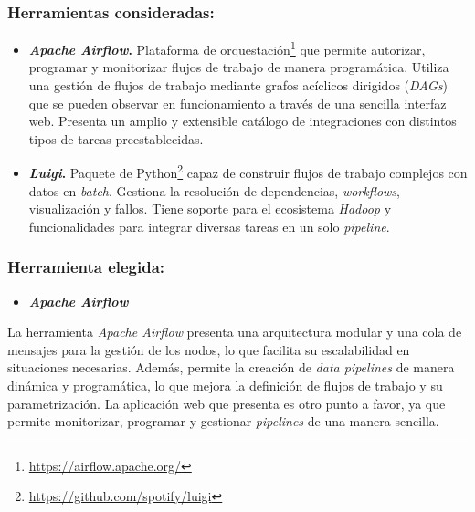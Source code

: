 \subsubsection{Herramientas consideradas:}

\begin{itemize}
    \item \textbf{\textit{Apache Airflow}.} Plataforma de orquestación\footnote{\url{https://airflow.apache.org/}} que permite autorizar, programar y monitorizar flujos de trabajo de manera programática. Utiliza una gestión de flujos de trabajo mediante grafos acíclicos dirigidos (\textit{DAGs}) que se pueden observar en funcionamiento a través de una sencilla interfaz web. Presenta un amplio y extensible catálogo de integraciones con distintos tipos de tareas preestablecidas.
    
    \item \textbf{\textit{Luigi}.} Paquete de Python\footnote{\url{https://github.com/spotify/luigi}} capaz de construir flujos de trabajo complejos con datos en \textit{batch}. Gestiona la resolución de dependencias, \textit{workflows}, visualización y fallos. Tiene soporte para el ecosistema \textit{Hadoop} y funcionalidades para integrar diversas tareas en un solo \textit{pipeline}.
\end{itemize}

\subsubsection{Herramienta elegida:}

\begin{itemize}
    \item \textbf{\textit{Apache Airflow}}
\end{itemize}

La herramienta \textit{Apache Airflow} presenta una arquitectura modular y una cola de mensajes para la gestión de los nodos, lo que facilita su escalabilidad en situaciones necesarias. Además, permite la creación de \textit{data pipelines} de manera dinámica y programática, lo que mejora la definición de flujos de trabajo y su parametrización. La aplicación web que presenta es otro punto a favor, ya que permite monitorizar, programar y gestionar \textit{pipelines} de una manera sencilla.
